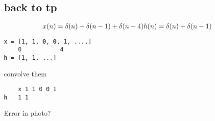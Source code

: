 \documentclass[
]{article}
\begin{document}
\hypertarget{back-to-tp}{%
\subsection{back to tp}\label{back-to-tp}}

\[
    x(n) = \delta(n) + \delta(n-1) + \delta(n-4) \\ h(n) = \delta(n) + \delta(n-1) 
\]

\begin{verbatim}
x = [1, 1, 0, 0, 1, ....]
    0           4
h = [1, 1, ...]
\end{verbatim}

convolve them

\begin{verbatim}
    x 1 1 0 0 1
h   1 1    
\end{verbatim}

Error in photo?
\end{document}

